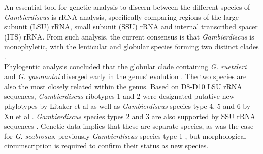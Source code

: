 \documentclass[12pt]{article}
\begin{document}
An essential tool for genetic analysis to discern between the different species of \emph{Gambierdiscus} is rRNA analysis, specifically comparing regions of the large subunit (LSU) rRNA, small subunit (SSU) rRNA and internal transcribed spacer (ITS) rRNA. From such analysis, the current consensus is that \emph{Gambierdiscus} is monophyletic, with the lenticular and globular species forming two distinct clades \cite{chinain1999morphology,litaker2009taxonomy,fraga2011gambierdiscus,richlen2008phylogeography,kuno2010genetic,litaker2010global,nishimura2013genetic}. \\
Phylogentic analysis concluded that the globular clade containing \emph{G. ruetzleri} and \emph{G. yasumotoi} diverged early in the genus' evolution \cite{litaker2009taxonomy,nishimura2013genetic}. The two species are also the most closely related within the genus. 
Based on D8-D10 LSU rRNA sequences, \emph{Gambierdiscus} ribotypes 1 and 2 were designated putative new phylotypes by Litaker et al as well as \emph{Gambierdiscus} species type 4, 5 and 6 by Xu et al \cite{litaker2010global,xu2014distribution}. \emph{Gambierdiscus} species types 2 and 3 are also supported by SSU rRNA sequences \cite{nishimura2013genetic,kuno2010genetic}. Genetic data implies that these are separate species, as was the case for \emph{G. scabrosus}, previously \emph{Gambierdiscus} species type 1 \cite{nishimura2013genetic,nishimura2014morphology}, but morphological circumscription is required to confirm their status as new species.
\end{document}
